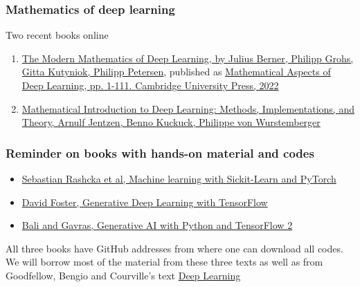 \documentclass{beamer}
\begin{document}
\begin{frame}
\frametitle{Mathematics of deep learning}

\begin{block}{Two recent books online }
\begin{enumerate}
\item \href{{https://arxiv.org/abs/2105.04026}}{The Modern Mathematics of Deep Learning, by Julius Berner, Philipp Grohs, Gitta Kutyniok, Philipp Petersen}, published as \href{{https://doi.org/10.1017/9781009025096.002}}{Mathematical Aspects of Deep Learning, pp. 1-111. Cambridge University Press, 2022}

\item \href{{https://doi.org/10.48550/arXiv.2310.20360}}{Mathematical Introduction to Deep Learning: Methods, Implementations, and Theory, Arnulf Jentzen, Benno Kuckuck, Philippe von Wurstemberger}
\end{enumerate}

\noindent
\end{block}
\end{frame}

\begin{frame}
\frametitle{Reminder on books with hands-on material and codes}

\begin{block}{}
\begin{itemize}
\item \href{{https://sebastianraschka.com/blog/2022/ml-pytorch-book.html}}{Sebastian Rashcka et al, Machine learning with Sickit-Learn and PyTorch}

\item \href{{https://www.oreilly.com/library/view/generative-deep-learning/9781098134174/ch01.html}}{David Foster, Generative Deep Learning with TensorFlow}

\item \href{{https://github.com/PacktPublishing/Hands-On-Generative-AI-with-Python-and-TensorFlow-2}}{Bali and Gavras, Generative AI with Python and TensorFlow 2}
\end{itemize}

\noindent
\end{block}

All three books have GitHub addresses from where  one can download all codes. We will borrow most of the material from these three texts as well as 
from Goodfellow, Bengio and Courville's text \href{{https://www.deeplearningbook.org/}}{Deep Learning}
\end{frame}
\end{document}
